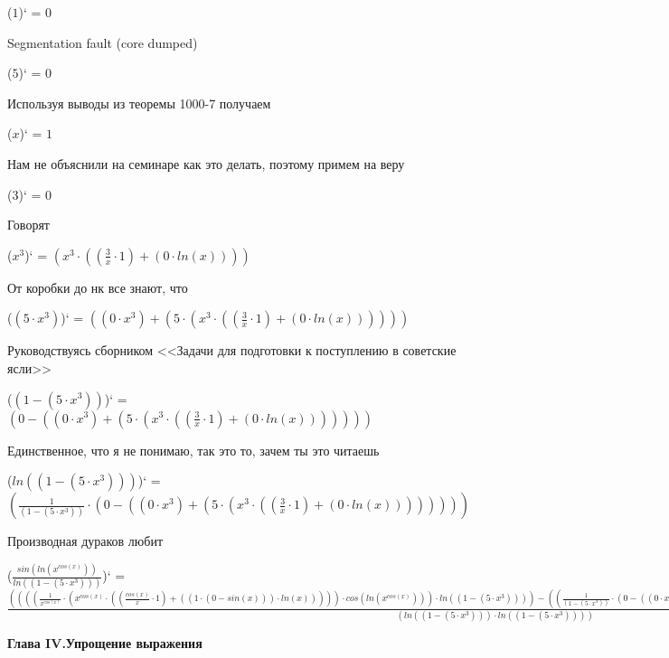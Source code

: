 \documentclass[12pt,a4paper,fleqn]{article}
\begin{document}
\begin{center}
($1$)`
 = $0$\end{center}
Segmentation fault (core dumped)

\begin{center}
($5$)`
 = $0$\end{center}
Используя выводы из теоремы 1000-7 получаем

\begin{center}
($x$)`
 = $1$\end{center}
Нам не объяснили на семинаре как это делать, поэтому примем на веру

\begin{center}
($3$)`
 = $0$\end{center}
Говорят

\begin{center}
($x^{3}$)`
 = $(x^{3} \cdot ((\frac{3}{x} \cdot 1) + (0 \cdot ln(x))))$\end{center}
От коробки до нк все знают, что

\begin{center}
($(5 \cdot x^{3})$)`
 = $((0 \cdot x^{3}) + (5 \cdot (x^{3} \cdot ((\frac{3}{x} \cdot 1) + (0 \cdot ln(x))))))$\end{center}
Руководствуясь сборником <<Задачи для подготовки к поступлению в советские ясли>>

\begin{center}
($(1 - (5 \cdot x^{3}))$)`
 = $(0 - ((0 \cdot x^{3}) + (5 \cdot (x^{3} \cdot ((\frac{3}{x} \cdot 1) + (0 \cdot ln(x)))))))$\end{center}
Единственное, что я не понимаю, так это то, зачем ты это читаешь

\begin{center}
($ln((1 - (5 \cdot x^{3})))$)`
 = $(\frac{1}{(1 - (5 \cdot x^{3}))} \cdot (0 - ((0 \cdot x^{3}) + (5 \cdot (x^{3} \cdot ((\frac{3}{x} \cdot 1) + (0 \cdot ln(x))))))))$\end{center}
Производная дураков любит

\begin{center}
($\frac{sin(ln(x^{cos(x)}))}{ln((1 - (5 \cdot x^{3})))}$)`
 = $\frac{((((\frac{1}{x^{cos(x)}} \cdot (x^{cos(x)} \cdot ((\frac{cos(x)}{x} \cdot 1) + ((1 \cdot (0 - sin(x))) \cdot ln(x))))) \cdot cos(ln(x^{cos(x)}))) \cdot ln((1 - (5 \cdot x^{3})))) - ((\frac{1}{(1 - (5 \cdot x^{3}))} \cdot (0 - ((0 \cdot x^{3}) + (5 \cdot (x^{3} \cdot ((\frac{3}{x} \cdot 1) + (0 \cdot ln(x)))))))) \cdot sin(ln(x^{cos(x)}))))}{(ln((1 - (5 \cdot x^{3}))) \cdot ln((1 - (5 \cdot x^{3}))))}$\end{center}
\newpage \textbf{\LARGE Глава IV.Упрощение выражения}
\end{document}
